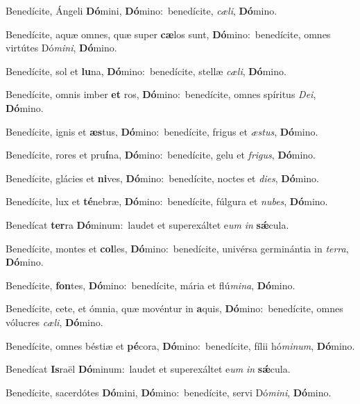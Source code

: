 Benedícite, Ángeli \textbf{Dó}mini, \textbf{Dó}mino:~\redgreheightstar benedícite, \textit{cæ}\textit{li}, \textbf{Dó}mino.

Benedícite, aquæ omnes, quæ super \textbf{cæ}los sunt, \textbf{Dó}mino:~\redgreheightstar benedícite, omnes virtútes Dó\textit{mi}\textit{ni}, \textbf{Dó}mino.

Benedícite, sol et \textbf{lu}na, \textbf{Dó}mino:~\redgreheightstar benedícite, stellæ \textit{cæ}\textit{li}, \textbf{Dó}mino.

Benedícite, omnis imber \textbf{et} ros, \textbf{Dó}mino:~\redgreheightstar benedícite, omnes spíritus \textit{De}\textit{i}, \textbf{Dó}mino.

Benedícite, ignis et \textbf{æs}tus, \textbf{Dó}mino:~\redgreheightstar benedícite, frigus et \textit{æs}\textit{tus}, \textbf{Dó}mino.

Benedícite, rores et pru\textbf{í}na, \textbf{Dó}mino:~\redgreheightstar benedícite, gelu et \textit{fri}\textit{gus}, \textbf{Dó}mino.

Benedícite, glácies et \textbf{ni}ves, \textbf{Dó}mino:~\redgreheightstar benedícite, noctes et \textit{di}\textit{es}, \textbf{Dó}mino.

Benedícite, lux et \textbf{té}nebræ, \textbf{Dó}mino:~\redgreheightstar benedícite, fúlgura et \textit{nu}\textit{bes}, \textbf{Dó}mino.

Benedícat \textbf{ter}ra \textbf{Dó}minum:~\redgreheightstar laudet et superexáltet e\textit{um} \textit{in} \textbf{sǽ}cula.

Benedícite, montes et \textbf{col}les, \textbf{Dó}mino:~\redgreheightstar benedícite, univérsa germinántia in \textit{ter}\textit{ra}, \textbf{Dó}mino.

Benedícite, \textbf{fon}tes, \textbf{Dó}mino:~\redgreheightstar benedícite, mária et flú\textit{mi}\textit{na}, \textbf{Dó}mino.

Benedícite, cete, et ómnia, quæ movéntur in \textbf{a}quis, \textbf{Dó}mino:~\redgreheightstar benedícite, omnes vólucres \textit{cæ}\textit{li}, \textbf{Dó}mino.

Benedícite, omnes béstiæ et \textbf{pé}cora, \textbf{Dó}mino:~\redgreheightstar benedícite, fílii hó\textit{mi}\textit{num}, \textbf{Dó}mino.

Benedícat \textbf{Is}raël \textbf{Dó}minum:~\redgreheightstar laudet et superexáltet e\textit{um} \textit{in} \textbf{sǽ}cula.

Benedícite, sacerdótes \textbf{Dó}mini, \textbf{Dó}mino:~\redgreheightstar benedícite, servi Dó\textit{mi}\textit{ni}, \textbf{Dó}mino.

